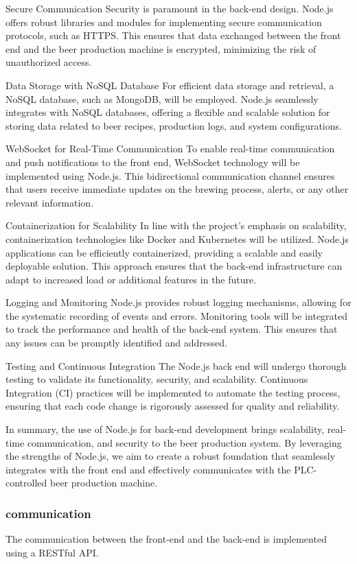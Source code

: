 Secure Communication
Security is paramount in the back-end design. Node.js offers robust libraries and modules for implementing secure communication protocols, such as HTTPS. This ensures that data exchanged between the front end and the beer production machine is encrypted, minimizing the risk of unauthorized access.

Data Storage with NoSQL Database
For efficient data storage and retrieval, a NoSQL database, such as MongoDB, will be employed. Node.js seamlessly integrates with NoSQL databases, offering a flexible and scalable solution for storing data related to beer recipes, production logs, and system configurations.

WebSocket for Real-Time Communication
To enable real-time communication and push notifications to the front end, WebSocket technology will be implemented using Node.js. This bidirectional communication channel ensures that users receive immediate updates on the brewing process, alerts, or any other relevant information.

Containerization for Scalability
In line with the project's emphasis on scalability, containerization technologies like Docker and Kubernetes will be utilized. Node.js applications can be efficiently containerized, providing a scalable and easily deployable solution. This approach ensures that the back-end infrastructure can adapt to increased load or additional features in the future.

Logging and Monitoring
Node.js provides robust logging mechanisms, allowing for the systematic recording of events and errors. Monitoring tools will be integrated to track the performance and health of the back-end system. This ensures that any issues can be promptly identified and addressed.

Testing and Continuous Integration
The Node.js back end will undergo thorough testing to validate its functionality, security, and scalability. Continuous Integration (CI) practices will be implemented to automate the testing process, ensuring that each code change is rigorously assessed for quality and reliability.

In summary, the use of Node.js for back-end development brings scalability, real-time communication, and security to the beer production system. By leveraging the strengths of Node.js, we aim to create a robust foundation that seamlessly integrates with the front end and effectively communicates with the PLC-controlled beer production machine.

\subsubsection{communication}
The communication between the front-end and the back-end is implemented using a RESTful API. 

